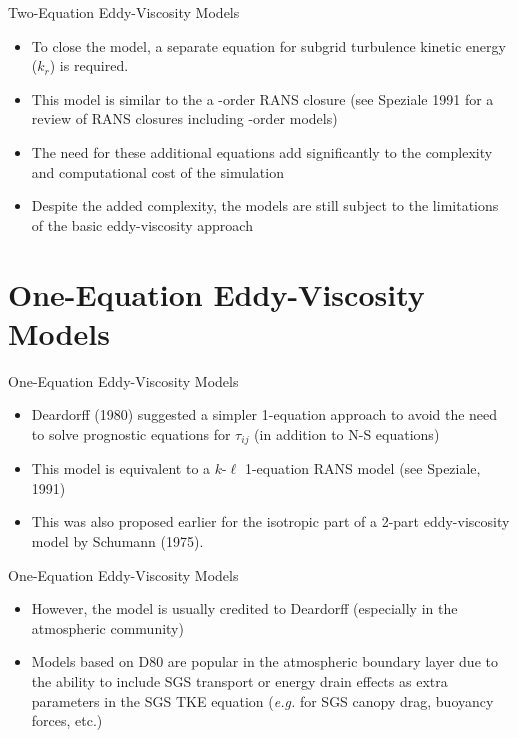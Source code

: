 \begin{frame}{Two-Equation Eddy-Viscosity Models}
\begin{itemize}
	\item To close the model, a separate equation for subgrid turbulence kinetic energy ($k_r$) is required.
	\item This model is similar to the a -order RANS closure (see Speziale 1991 for a review of RANS closures including -order models) 
	\item The need for these additional equations add significantly to the complexity and computational cost of the simulation
	\item Despite the added complexity, the models are still subject to the limitations of the basic eddy-viscosity approach
\end{itemize}

\end{frame}

\section{One-Equation Eddy-Viscosity Models} %
\begin{frame}{One-Equation Eddy-Viscosity Models}
\begin{itemize}
	\item Deardorff (1980) suggested a simpler 1-equation approach to avoid the need  to solve prognostic equations for $\tau_{ij}$ (in addition to N-S equations) 
	\item This model is equivalent to a $k$-$\ell$ 1-equation RANS model (see Speziale, 1991)
	\item This was also proposed earlier for the isotropic part of a 2-part eddy-viscosity model by Schumann (1975).
\end{itemize}

\end{frame}


\begin{frame}{One-Equation Eddy-Viscosity Models}
\begin{itemize}
	\item However, the model is usually credited to Deardorff (especially in the atmospheric community)
	\item Models based on D80 are popular in the atmospheric boundary layer due to the ability to include SGS transport or energy drain effects as extra parameters in the SGS TKE equation (\textit{e.g.} for SGS canopy drag,  buoyancy forces, etc.)  
\end{itemize}

\end{frame}

